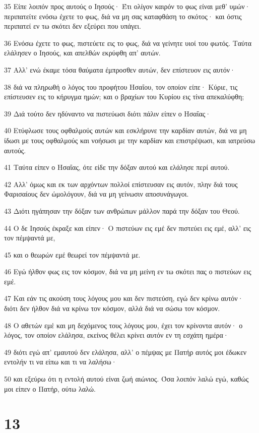 \par 35 Είπε λοιπόν προς αυτούς ο Ιησούς· Έτι ολίγον καιρόν το φως είναι μεθ' υμών· περιπατείτε ενόσω έχετε το φως, διά να μη σας καταφθάση το σκότος· και όστις περιπατεί εν τω σκότει δεν εξεύρει που υπάγει.
\par 36 Ενόσω έχετε το φως, πιστεύετε εις το φως, διά να γείνητε υιοί του φωτός. Ταύτα ελάλησεν ο Ιησούς, και απελθών εκρύφθη απ' αυτών.
\par 37 Αλλ' ενώ έκαμε τόσα θαύματα έμπροσθεν αυτών, δεν επίστευον εις αυτόν·
\par 38 διά να πληρωθή ο λόγος του προφήτου Ησαΐου, τον οποίον είπε· Κύριε, τις επίστευσεν εις το κήρυγμα ημών; και ο βραχίων του Κυρίου εις τίνα απεκαλύφθη;
\par 39 Διά τούτο δεν ηδύναντο να πιστεύωσι διότι πάλιν είπεν ο Ησαΐας·
\par 40 Ετύφλωσε τους οφθαλμούς αυτών και εσκλήρυνε την καρδίαν αυτών, διά να μη ίδωσι με τους οφθαλμούς και νοήσωσι με την καρδίαν και επιστρέψωσι, και ιατρεύσω αυτούς.
\par 41 Ταύτα είπεν ο Ησαΐας, ότε είδε την δόξαν αυτού και ελάλησε περί αυτού.
\par 42 Αλλ' όμως και εκ των αρχόντων πολλοί επίστευσαν εις αυτόν, πλην διά τους Φαρισαίους δεν ώμολόγουν, διά να μη γείνωσιν αποσυνάγωγοι.
\par 43 Διότι ηγάπησαν την δόξαν των ανθρώπων μάλλον παρά την δόξαν του Θεού.
\par 44 Ο δε Ιησούς έκραξε και είπεν· Ο πιστεύων εις εμέ δεν πιστεύει εις εμέ, αλλ' εις τον πέμψαντά με,
\par 45 και ο θεωρών εμέ θεωρεί τον πέμψαντά με.
\par 46 Εγώ ήλθον φως εις τον κόσμον, διά να μη μείνη εν τω σκότει πας ο πιστεύων εις εμέ.
\par 47 Και εάν τις ακούση τους λόγους μου και δεν πιστεύση, εγώ δεν κρίνω αυτόν· διότι δεν ήλθον διά να κρίνω τον κόσμον, αλλά διά να σώσω τον κόσμον.
\par 48 Ο αθετών εμέ και μη δεχόμενος τους λόγους μου, έχει τον κρίνοντα αυτόν· ο λόγος, τον οποίον ελάλησα, εκείνος θέλει κρίνει αυτόν εν τη εσχάτη ημέρα·
\par 49 διότι εγώ απ' εμαυτού δεν ελάλησα, αλλ' ο πέμψας με Πατήρ αυτός μοι έδωκεν εντολήν τι να είπω και τι να λαλήσω·
\par 50 και εξεύρω ότι η εντολή αυτού είναι ζωή αιώνιος. Όσα λοιπόν λαλώ εγώ, καθώς μοι είπεν ο Πατήρ, ούτω λαλώ.

\chapter{13}

